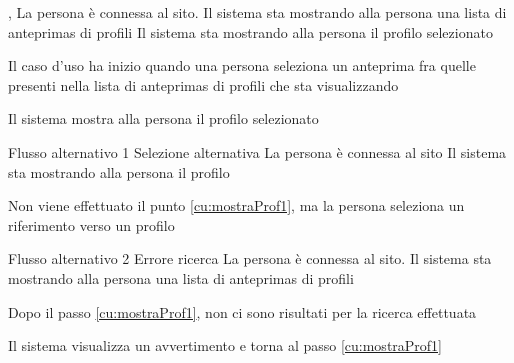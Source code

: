 {, }
{La persona è connessa al sito. Il sistema sta mostrando alla persona una lista di \glspl{anteprima} di profili}
{Il sistema sta mostrando alla persona il profilo selezionato}
{\begin{enumCU}
	\item Il caso d'uso ha inizio quando una persona seleziona un \gls{anteprima} fra quelle presenti nella lista di \glspl{anteprima} di profili che sta visualizzando\label{cu:mostraProf1}
	\item Il sistema mostra alla persona il profilo selezionato
\end{enumCU}
}
%
{Flusso alternativo 1}%
{Selezione alternativa}%
{La persona è connessa al sito}%
{Il sistema sta mostrando alla persona il profilo}%
{\begin{enumCU}
		\item Non viene effettuato il punto \ref{cu:mostraProf1}, ma la persona seleziona un \gls{riferimento} verso un profilo
\end{enumCU}}%
%
{Flusso alternativo 2}%
{Errore ricerca}%
{La persona è connessa al sito. Il sistema sta mostrando alla persona una lista di \glspl{anteprima} di profili}%
{\postNulle}%
{\begin{enumCU}
		\item Dopo il passo \ref{cu:mostraProf1}, non ci sono risultati per la ricerca effettuata
		\item Il sistema visualizza un avvertimento e torna al passo \ref{cu:mostraProf1}
\end{enumCU}}%


